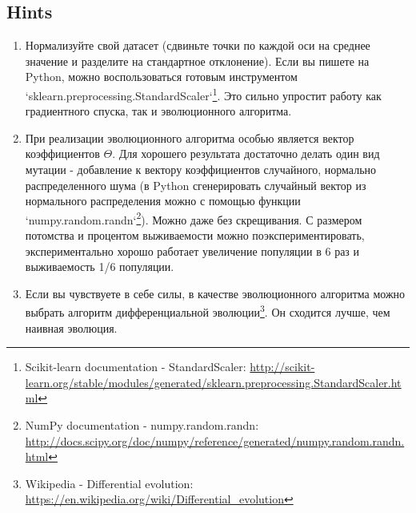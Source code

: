 \documentclass[a4paper, unicode]{article}
\begin{document}
\subsection{Hints}
\label{sec:orgheadline8}
\begin{enumerate}
\item Нормализуйте свой датасет (сдвиньте точки по каждой оси на среднее значение и
разделите на стандартное отклонение). Если вы пишете на Python, можно
воспользоваться готовым инструментом
`sklearn.preprocessing.StandardScaler`\footnote{Scikit-learn documentation - StandardScaler: \url{http://scikit-learn.org/stable/modules/generated/sklearn.preprocessing.StandardScaler.html}}.
Это сильно упростит работу как градиентного спуска, так и эволюционного алгоритма.
\item При реализации эволюционного алгоритма особью является вектор коэффициентов
\(\Theta\). Для хорошего результата достаточно делать один вид мутации -
добавление к вектору коэффициентов случайного, нормально распределенного шума
(в Python сгенерировать случайный вектор из нормального распределения можно с
помощью функции `numpy.random.randn`\footnote{NumPy documentation - numpy.random.randn: \url{http://docs.scipy.org/doc/numpy/reference/generated/numpy.random.randn.html}}). Можно даже без скрещивания. С
размером потомства и процентом выживаемости можно поэкспериментировать,
экспериментально хорошо работает увеличение популяции в 6 раз и выживаемость
1/6 популяции.
\item Если вы чувствуете в себе силы, в качестве эволюционного алгоритма можно
выбрать алгоритм дифференциальной эволюции\footnote{Wikipedia - Differential evolution: \url{https://en.wikipedia.org/wiki/Differential_evolution}}. Он сходится лучше, чем
наивная эволюция.
\end{enumerate}
\end{document}
